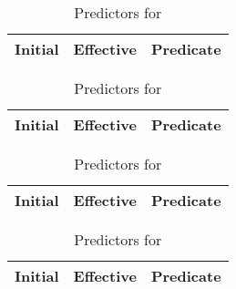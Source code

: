 
\newcommand{\view}[2]{%
  \begin{table}
    \caption{Predictors for #1}
    \label{tab:views-#2}
    \centering
    \tiny
    \begin{tabular}{lll}
      \toprule
      Initial & Effective & Predicate \\
      \midrule
      
      \bottomrule
    \end{tabular}
  \end{table}}

\view{\ccrypt}{ccrypt}
\view{\bc}{bc}
\view{\exif}{exif}
\view{\rhythmbox}{rhythmbox}
